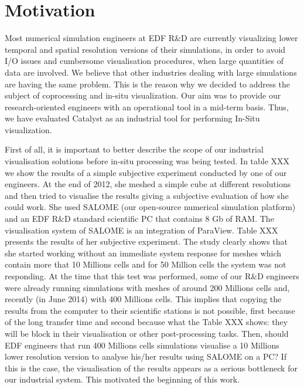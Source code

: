 \section{Motivation}
\label{sec:motivation}

Most numerical simulation engineers at EDF R\&D are currently visualizing lower
temporal and spatial resolution versions of their simulations, in order to avoid
I/O issues and cumbersome visualisation procedures, when large quantities of
data are involved. We believe that other industries dealing with large
simulations are having the same problem. This is the reason why we decided to
address the subject of coprocessing and in-situ visualization. Our aim was to
provide our research-oriented engineers with an operational tool in a mid-term
basis. Thus, we have evaluated Catalyst as an industrial tool for performing
In-Situ visualization. 

First of all, it is important to better describe the scope of our industrial
visualisation solutions before in-situ processing was being tested. In table XXX
we show the results of a simple subjective experiment conducted by one of our
engineers. At the end of 2012, she meshed a simple cube at different resolutions
and then tried to visualise the results giving a subjective evaluation of how
she could work. She used SALOME (our open-source numerical simulation platform)
and an EDF R\&D standard scientific PC that contains 8 Gb of RAM. The
visualisation system of SALOME is an integration of ParaView. Table XXX presents
the results of her subjective experiment. The study clearly shows that she
started working without an immediate system response for meshes which contain
more that 10 Millions cells and for 50 Million cells the system was not
responding. At the time that this test was performed, some of our R\&D engineers
were already running simulations with meshes of around 200 Millions cells and,
recently (in June 2014) with 400 Millions cells. This implies that copying the
results from the computer to their scientific stations is not possible, first
because of the long transfer time and second because what the Table XXX shows:
they will be block in their visualisation or other post-processing tasks. Then,
should EDF engineers that run 400 Millions cells simulations visualise a 10
Millions lower resolution version to analyse his/her results using SALOME on a
PC? If this is the case, the visualisation of the results appears as a serious
bottleneck for our industrial system. This motivated the beginning of this work.

